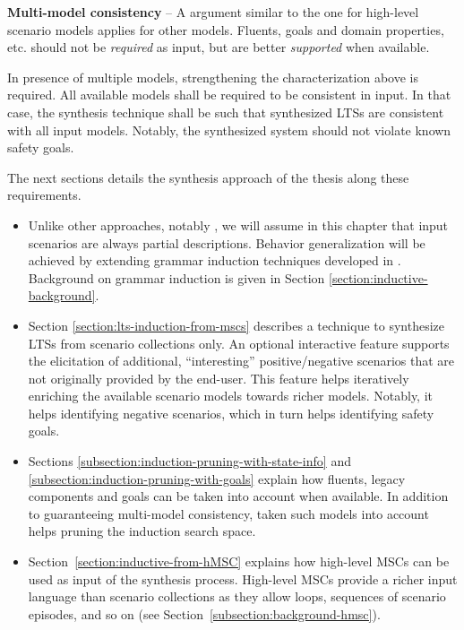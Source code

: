 \begin{description}
\item{\textbf{Multi-model consistency}} -- A argument similar to the one for high-level scenario models applies for other models. Fluents, goals and domain properties, etc. should not be \emph{required} as input, but are better \emph{supported} when available. 

In presence of multiple models, strengthening the characterization above is required. All available models shall be required to be consistent in input. In that case, the synthesis technique shall be such that synthesized LTSs are consistent with all input models. Notably, the synthesized system should not violate known safety goals.

\end{description}

The next sections details the synthesis approach of the thesis along these requirements. 

\begin{itemize}

\item Unlike other approaches, notably \cite{Uchitel:2003}, we will assume in this chapter that input scenarios are always partial descriptions. Behavior generalization will be achieved by extending grammar induction techniques developed in \cite{Oncina:1992, Dupont:1996b}. Background on grammar induction is given in Section \ref{section:inductive-background}.

\item Section \ref{section:lts-induction-from-mscs} describes a technique to synthesize LTSs from scenario collections only. An optional interactive feature supports the elicitation of additional, ``interesting'' positive/negative scenarios that are not originally provided by the end-user. This feature helps iteratively enriching the available scenario models towards richer models. Notably, it helps identifying negative scenarios, which in turn helps identifying safety goals.

\item Sections \ref{subsection:induction-pruning-with-state-info} and \ref{subsection:induction-pruning-with-goals} explain how fluents, legacy components and goals can be taken into account when available. In addition to guaranteeing multi-model consistency, taken such models into account helps pruning the induction search space. 

\item Section~\ref{section:inductive-from-hMSC} explains how high-level MSCs can be used as input of the synthesis process. High-level MSCs provide a richer input language than scenario collections as they allow loops, sequences of scenario episodes, and so on (see Section~\ref{subsection:background-hmsc}). 

\end{itemize}
